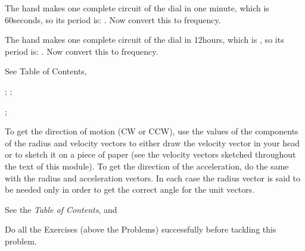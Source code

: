 {%
{The  hand makes one complete circuit of the dial in one minute,
 which is 60\unit{seconds}, so its period is: .
 Now convert this to frequency.

 The  hand makes one complete circuit of the dial in 12\unit{hours}, which
 is , so its period is: .
 Now convert this to frequency.
}

%
{See Table of Contents, }

%
{; ; 
}

%
{; 
}

%
{To get the direction of motion (CW or CCW), use the values of the components of the radius and velocity
vectors to either draw the velocity vector in your head or to sketch it on a piece of paper (see the
velocity vectors sketched throughout the text of this module).  To get the direction of the acceleration,
do the same with the radius and acceleration vectors.  In each case the radius vector is said to be needed
only in order to get the correct angle for the unit vectors.
}

%
{See the \textit{Table of Contents},  and
}

%
{Do all the Exercises (above the Problems) successfully before tackling this
 problem.
}

}%
